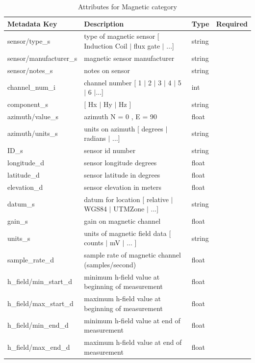 \documentclass{article}
\begin{document}
\begin{table}[htb!]
	\caption[Attributes for Magnetic Channel]{Attributes for Magnetic category}
	\begin{tabular}{|l|p{3in}|l|l|}
		\hline
		\textbf{Metadata Key} & \textbf{Description} & \textbf{Type} & \textbf{Required} \\ \hline
		sensor/type\_s & type of magnetic sensor [ Induction Coil $|$ flux gate $|$ ...] & string & \\ \hline
		sensor/manufacturer\_s & magnetic sensor manufacturer & string &  \\ \hline
		sensor/notes\_s & notes on sensor & string &  \\ \hline
		channel\_num\_i & channel number [ 1 $|$ 2 $|$ 3 $|$ 4 $|$ 5 $|$ 6 $|$...] & int &  \\ \hline
		component\_s & [ Hx $|$ Hy $|$ Hz ] & string  &  \\ \hline
		azimuth/value\_s & azimuth N = 0 ,  E = 90 & float &  \\ \hline
		azimuth/units\_s & units on azimuth [ degrees $|$ radians $|$ ...] & string &  \\ \hline
		ID\_s & sensor id number & string &  \\ \hline
		longitude\_d & sensor longitude degrees & float &  \\ \hline
		latitude\_d & sensor latitude in degrees & float &  \\ \hline
		elevation\_d & sensor elevation in meters & float &  \\ \hline
		datum\_s & datum for location [ relative $|$ WGS84 $|$ UTMZone $|$ ...] & string &  \\ \hline
		gain\_s & gain on magnetic channel & float &  \\ \hline
		units\_s & units of magnetic field data [ counts $|$ mV $|$ ... ] & string &  \\ \hline
		sample\_rate\_d & sample rate of magnetic channel (samples/second) & float &  \\ \hline
		h\_field/min\_start\_d & minimum h-field value at beginning of measurement & float &  \\ \hline
		h\_field/max\_start\_d & maximum h-field value at beginning of measurement & float &  \\ \hline
		h\_field/min\_end\_d & minimum h-field value at end of measurement & float &  \\ \hline
		h\_field/max\_end\_d & maximum h-field value at end of measurement & float &  \\ \hline

\end{tabular}
\end{table}
\end{document}
